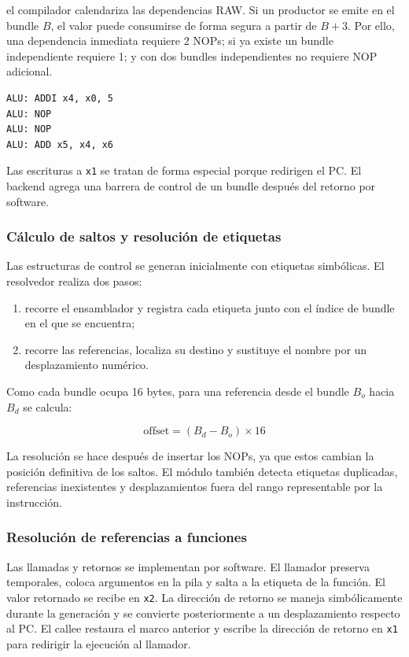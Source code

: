 \documentclass[11pt,letterpaper]{article}
\begin{document}
el compilador calendariza las dependencias RAW. Si un productor se emite en el bundle $B$, el valor puede consumirse de forma segura a partir de $B+3$. Por ello, una dependencia inmediata requiere 2 NOPs; si ya existe un bundle independiente requiere 1; y con dos bundles independientes no requiere NOP adicional.

\begin{lstlisting}[style=asm]
ALU: ADDI x4, x0, 5
ALU: NOP
ALU: NOP
ALU: ADD x5, x4, x6
\end{lstlisting}

Las escrituras a \texttt{x1} se tratan de forma especial porque redirigen el PC. El backend agrega una barrera de control de un bundle después del retorno por software.

\subsubsection{Cálculo de saltos y resolución de etiquetas}

Las estructuras de control se generan inicialmente con etiquetas simbólicas. El resolvedor realiza dos pasos:

\begin{enumerate}[leftmargin=*]
    \item recorre el ensamblador y registra cada etiqueta junto con el índice de bundle en el que se encuentra;
    \item recorre las referencias, localiza su destino y sustituye el nombre por un desplazamiento numérico.
\end{enumerate}

Como cada bundle ocupa 16 bytes, para una referencia desde el bundle $B_o$ hacia $B_d$ se calcula:

\[
\text{offset}=(B_d-B_o)\times 16
\]

La resolución se hace después de insertar los NOPs, ya que estos cambian la posición definitiva de los saltos. El módulo también detecta etiquetas duplicadas, referencias inexistentes y desplazamientos fuera del rango representable por la instrucción.

\subsubsection{Resolución de referencias a funciones}

Las llamadas y retornos se implementan por software. El llamador preserva temporales, coloca argumentos en la pila y salta a la etiqueta de la función. El valor retornado se recibe en \texttt{x2}. La dirección de retorno se maneja simbólicamente durante la generación y se convierte posteriormente a un desplazamiento respecto al PC. El callee restaura el marco anterior y escribe la dirección de retorno en \texttt{x1} para redirigir la ejecución al llamador.
\end{document}
